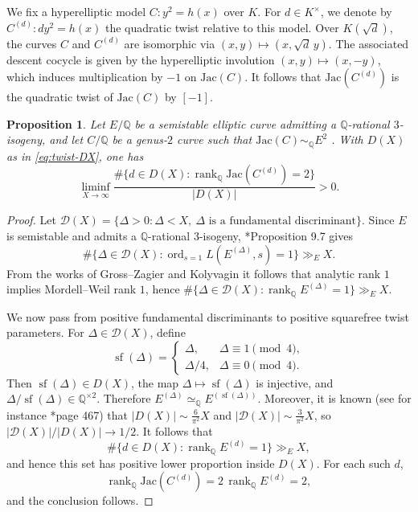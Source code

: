 \documentclass{amsart}
\newcommand{\Jac}{\mathrm{Jac}}
\DeclareMathOperator{\ord}{ord}
\DeclareMathOperator{\rank}{\mathrm{rank}}
\newtheorem{proposition}{Proposition}[section]
\begin{document}
We fix a hyperelliptic model $C:y^2=h(x)$ over $K$. For $d\in K^\times$, we denote by
$C^{(d)}:dy^2=h(x)$ the quadratic twist relative to this model. Over $K(\sqrt d)$, the curves $C$ and $C^{(d)}$ are isomorphic via
$(x,y)\mapsto (x,\sqrt d\,y)$. The associated descent cocycle is given by the
hyperelliptic involution $(x,y)\mapsto(x,-y)$, which induces multiplication by
$-1$ on $\Jac(C)$. It follows that $\Jac(C^{(d)})$ is the quadratic twist of
$\Jac(C)$ by $[-1]$.



\begin{proposition}\label{square twist}
Let \(E/\mathbb Q\) be a semistable elliptic curve admitting a
\(\mathbb Q\)-rational \(3\)-isogeny, and let \(C/\mathbb Q\) be a genus-\(2\)
curve such that $
\Jac(C)\sim_{\mathbb Q} E^2$ .
With \(D(X)\) as in \eqref{eq:twist-DX}, one has
\[
\liminf_{X\to\infty}
\frac{
\#\{d\in D(X): \rank_{\mathbb Q}\Jac(C^{(d)})=2\}
}{
|D(X)|
}
>0 .
\]
\end{proposition}

\begin{proof}
Let $
\mathcal D(X)=
\{\Delta>0:\Delta<X,\ \Delta\text{ is a fundamental discriminant}\}$.
Since \(E\) is semistable and admits a \(\mathbb Q\)-rational \(3\)-isogeny,
\cite{KrizLi2019}*{Proposition 9.7} gives
\[
\#\{\Delta\in\mathcal D(X):
\ord_{s=1}L(E^{(\Delta)},s)=1\}\gg_E X .
\]
From the works of Gross--Zagier \cite{GrossZagier1986} and Kolyvagin \cite{Kol89} it follows that analytic rank \(1\) implies
Mordell--Weil rank \(1\),  hence
$
\#\{\Delta\in\mathcal D(X):
\rank_{\mathbb Q}E^{(\Delta)}=1\}\gg_E X $.


We now pass from positive fundamental discriminants to positive squarefree twist
parameters. For \(\Delta\in\mathcal D(X)\), define
\[
\operatorname{sf}(\Delta)=
\begin{cases}
\Delta, & \Delta\equiv 1 \pmod 4,\\
\Delta/4, & \Delta\equiv 0 \pmod 4.
\end{cases}
\]
Then \(\operatorname{sf}(\Delta)\in D(X)\), the map
\(\Delta\mapsto \operatorname{sf}(\Delta)\) is injective, and
$
\Delta/\operatorname{sf}(\Delta)\in\mathbb Q^{\times 2}$.
Therefore
$
E^{(\Delta)}\simeq_{\mathbb Q}E^{(\operatorname{sf}(\Delta))}$.
Moreover, it is known  (see for instance \cite{FouvryKlueners2007}*{page 467}) that
$
|D(X)|\sim \frac{6}{\pi^2}X$ and
$|\mathcal D(X)|\sim \frac{3}{\pi^2}X$,
so \(|\mathcal D(X)|/|D(X)|\to 1/2\). It follows that
\[
\#\{d\in D(X):\rank_{\mathbb Q}E^{(d)}=1\}\gg_E X,
\]
and hence this set has positive lower proportion inside \(D(X)\). For each such \(d\),
\[
\rank_{\mathbb Q}\Jac(C^{(d)})
=
2\,\rank_{\mathbb Q}E^{(d)}
=
2,
\]
and the conclusion follows.
\end{proof}
\end{document}
